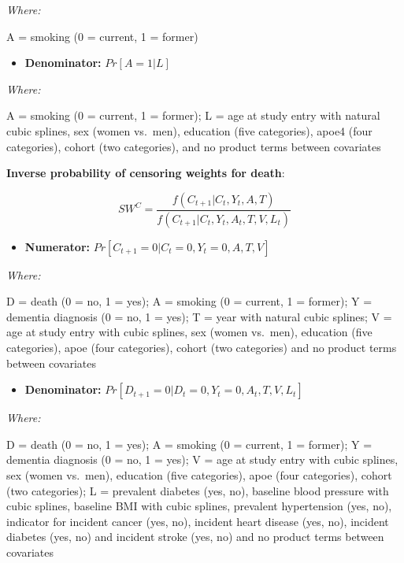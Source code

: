 \documentclass[
]{book}
\providecommand{\tightlist}{%
  \setlength{\itemsep}{0pt}\setlength{\parskip}{0pt}}
\begin{document}
\emph{Where:}

A = smoking (0 = current, 1 = former)

\begin{itemize}
\tightlist
\item
  \textbf{Denominator:} \(Pr[A = 1|L]\)
\end{itemize}

\emph{Where:}

A = smoking (0 = current, 1 = former); L = age at study entry with natural cubic splines, sex (women vs.~men), education (five categories), apoe4 (four categories), cohort (two categories), and no product terms between covariates

\textbf{Inverse probability of censoring weights for death}:

\[SW^C = \frac{f(C_{t+1}|C_t, Y_t, A, T)}{f(C_{t+1}|C_t, Y_t, A_t, T, V, L_t)}\]

\begin{itemize}
\tightlist
\item
  \textbf{Numerator:} \(Pr[C_{t+1} = 0|C_t = 0, Y_t = 0, A, T, V]\)
\end{itemize}

\emph{Where:}

D = death (0 = no, 1 = yes); A = smoking (0 = current, 1 = former); Y = dementia diagnosis (0 = no, 1 = yes); T = year with natural cubic splines; V = age at study entry with cubic splines, sex (women vs.~men), education (five categories), apoe (four categories), cohort (two categories) and no product terms between covariates

\begin{itemize}
\tightlist
\item
  \textbf{Denominator:} \(Pr[D_{t+1} = 0|D_t = 0, Y_t = 0, A_t, T, V, L_t]\)
\end{itemize}

\emph{Where:}

D = death (0 = no, 1 = yes); A = smoking (0 = current, 1 = former); Y = dementia diagnosis (0 = no, 1 = yes); V = age at study entry with cubic splines, sex (women vs.~men), education (five categories), apoe (four categories), cohort (two categories); L = prevalent diabetes (yes, no), baseline blood pressure with cubic splines, baseline BMI with cubic splines, prevalent hypertension (yes, no), indicator for incident cancer (yes, no), incident heart disease (yes, no), incident diabetes (yes, no) and incident stroke (yes, no) and no product terms between covariates

\newpage
\end{document}
